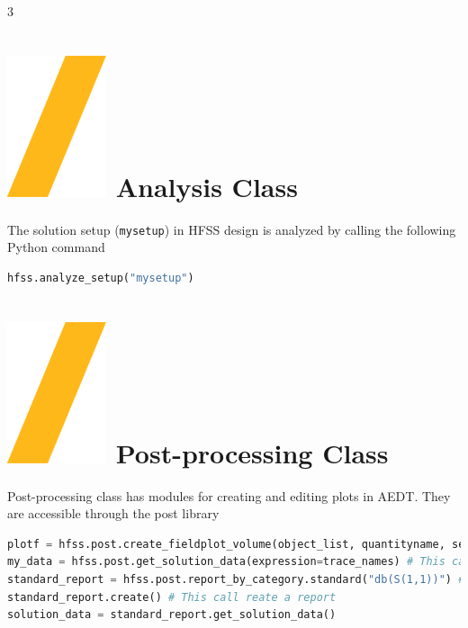 \documentclass[9pt,landscape]{article}
\begin{document}
\begin{multicols}{3}
\section{\includegraphics[height=\fontcharht\font`\S]{slash.png} Analysis Class}
The solution setup (\texttt{mysetup}) in HFSS design is analyzed by calling the following Python command
\begin{lstlisting}[language=Python]
hfss.analyze_setup("mysetup")
\end{lstlisting}
\section{\includegraphics[height=\fontcharht\font`\S]{slash.png} Post-processing Class}
Post-processing class has modules for creating and editing plots in AEDT. They are accessible through the post library
\begin{lstlisting}[language=Python]
plotf = hfss.post.create_fieldplot_volume(object_list, quantityname, setup_name, intrinsic_dict) # This call returns a FieldPlot object
my_data = hfss.post.get_solution_data(expression=trace_names) # This call returns a SolutionData object
standard_report = hfss.post.report_by_category.standard("db(S(1,1))") # This call returns a new standard report object
standard_report.create() # This call reate a report
solution_data = standard_report.get_solution_data()
\end{lstlisting}


\end{multicols}
\end{document}
